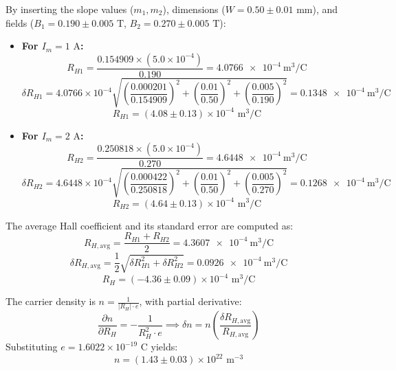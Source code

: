 \documentclass[a4paper,11pt]{article}
\begin{document}
By inserting the slope values ($m_1, m_2$), dimensions ($W = 0.50 \pm 0.01\text{ mm}$), and fields ($B_1 = 0.190 \pm 0.005\text{ T}$, $B_2 = 0.270 \pm 0.005\text{ T}$):
\begin{itemize}
    \item {\bf For $I_m = 1\text{ A}$:}
    \begin{equation*}
        R_{H1} = \frac{0.154909 \times (5.0\times 10^{-4})}{0.190} = \SI{4.0766e-4}{\meter\cubed\per\coulomb}
    \end{equation*}
    \begin{equation*}
        \delta R_{H1} = 4.0766 \times 10^{-4} \sqrt{\left(\frac{0.000201}{0.154909}\right)^2 + \left(\frac{0.01}{0.50}\right)^2 + \left(\frac{0.005}{0.190}\right)^2} = \SI{0.1348e-4}{\meter\cubed\per\coulomb}
    \end{equation*}
    $$R_{H1} = (4.08 \pm 0.13) \times 10^{-4} \text{ m}^3/\text{C}$$

    \item {\bf For $I_m = 2\text{ A}$:}
    \begin{equation*}
        R_{H2} = \frac{0.250818 \times (5.0\times 10^{-4})}{0.270} = \SI{4.6448e-4}{\meter\cubed\per\coulomb}
    \end{equation*}
    \begin{equation*}
        \delta R_{H2} = 4.6448 \times 10^{-4} \sqrt{\left(\frac{0.000422}{0.250818}\right)^2 + \left(\frac{0.01}{0.50}\right)^2 + \left(\frac{0.005}{0.270}\right)^2} = \SI{0.1268e-4}{\meter\cubed\per\coulomb}
    \end{equation*}
    $$R_{H2} = (4.64 \pm 0.13) \times 10^{-4} \text{ m}^3/\text{C}$$
\end{itemize}
The average Hall coefficient and its standard error are computed as:
\begin{equation}
    R_{H,\text{avg}} = \frac{R_{H1} + R_{H2}}{2} = \SI{4.3607e-4}{\meter\cubed\per\coulomb}
\end{equation}
\begin{equation}
    \delta R_{H,\text{avg}} = \frac{1}{2}\sqrt{\delta R_{H1}^2 + \delta R_{H2}^2} = \SI{0.0926e-4}{\meter\cubed\per\coulomb}
\end{equation}
$$R_H = (-4.36 \pm 0.09) \times 10^{-4} \text{ m}^3/\text{C}$$

The carrier density is $n = \frac{1}{|R_H| \cdot e}$, with partial derivative:
\begin{equation}
    \frac{\partial n}{\partial R_H} = -\frac{1}{R_H^2 \cdot e} \implies \delta n = n \left(\frac{\delta R_{H,\text{avg}}}{R_{H,\text{avg}}}\right)
\end{equation}
Substituting $e = 1.6022 \times 10^{-19}\text{ C}$ yields:
\begin{equation}
    n = (1.43 \pm 0.03) \times 10^{22} \text{ m}^{-3}
\end{equation}
\end{document}
